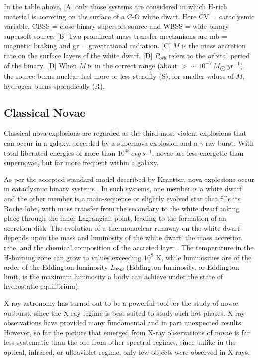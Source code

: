 			In the table above, [A] only those systems are considered in which H-rich material is accreting on the surface of a C-O white dwarf. Here CV = cataclysmic variable, CBSS = close-binary supersoft source and WBSS = wide-binary supersoft source. [B] Two prominent mass transfer mechanisms are mb = magnetic braking and gr = gravitational radiation. [C] $\dot{M}$ is the mass accretion rate on the surface layers of the white dwarf. [D] $P_{orb}$ refers to the orbital period of the binary. [D] When $\dot{M}$ is in the correct range (about $>\sim 10^{-7}\,M_{\bigodot}\,yr^{-1}$), the source burns nuclear fuel more or less steadily (S); for smaller values of $\dot{M}$, hydrogen burns sporadically (R).
			
		\subsection{Classical Novae} \label{introduction:current_status:CNe}
			Classical nova explosions are regarded as the third most violent explosions that can occur in a galaxy, preceded by a supernova explosion and a $\gamma$-ray burst. With total liberated energies of more than $10^{45}\,erg\,s^{-1}$, novae are less energetic than supernovae, but far more frequent within a galaxy.
			
			As per the accepted standard model described by Krautter, nova explosions occur in cataclysmic binary systems \cite{krautter08}. In such systems, one member is a white dwarf and the other member is a main-sequence or slightly evolved star that fills its Roche lobe, with mass transfer from the secondary to the white dwarf taking place through the inner Lagrangian point, leading to the formation of an accretion disk. The evolution of a thermonuclear runaway on the white dwarf depends upon the mass and luminosity of the white dwarf, the mass accretion rate, and the chemical composition of the accreted layer \cite{starrfield89}. The temperature in the H-burning zone can grow to values exceeding $10^8$ K, while luminosities are of the order of the Eddington luminosity $L_{Edd}$ (Eddington luminosity, or Eddington limit, is the maximum luminosity a body can achieve under the state of hydrostatic equilibrium).
			
			X-ray astronomy has turned out to be a powerful tool for the study of novae outburst, since the X-ray regime is best suited to study such hot phases. X-ray observations have provided many fundamental and in part unexpected results. However, so far the picture that emerged from X-ray observations of novae is far less systematic than the one from other spectral regimes, since unlike in the optical, infrared, or ultraviolet regime, only few objects were observed in X-rays.
			
